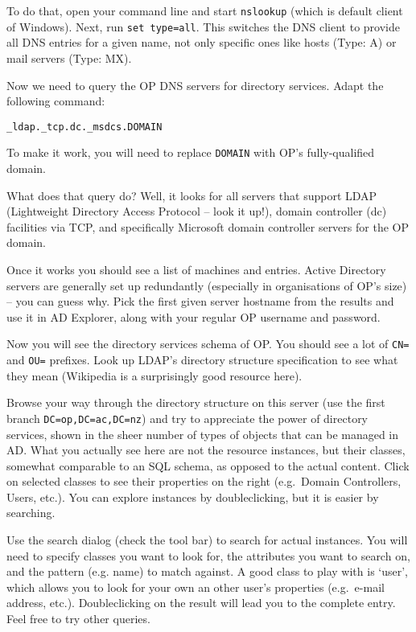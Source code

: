 \documentclass{article}
\begin{document}
To do that, open your command line and start {\tt nslookup} (which is default client of Windows). Next, run {\tt set type=all}. This switches the DNS client to provide all DNS entries for a given name, not only specific ones like hosts (Type: A) or mail servers (Type: MX).

Now we need to query the OP DNS servers for directory services. Adapt the following command:

{\tt \_ldap.\_tcp.dc.\_msdcs.DOMAIN}
 
To make it work, you will need to replace {\tt DOMAIN} with OP's fully-qualified domain.

What does that query do? Well, it looks for all servers that support LDAP (Lightweight Directory Access Protocol -- look it up!), domain controller (dc) facilities via TCP, and specifically Microsoft domain controller servers for the OP domain.

Once it works you should see a list of machines and entries. Active Directory servers are generally set up redundantly (especially in organisations of OP's size) -- you can guess why. Pick the first given server hostname from the results and use it in AD Explorer, along with your regular OP username and password.

Now you will see the directory services schema of OP. You should see a lot of {\tt CN=} and {\tt OU=} prefixes. Look up LDAP's directory structure specification to see what they mean (Wikipedia is a surprisingly good resource here).

Browse your way through the directory structure on this server (use the first branch {\tt DC=op,DC=ac,DC=nz}) and try to appreciate the power of directory services, shown in the sheer number of types of objects that can be managed in AD. What you actually see here are not the resource instances, but their classes, somewhat comparable to an SQL schema, as opposed to the actual content. Click on selected classes to see their properties on the right (e.g.~Domain Controllers, Users, etc.). You can explore instances by doubleclicking, but it is easier by searching.

Use the search dialog (check the tool bar) to search for actual instances. You will need to specify classes you want to look for, the attributes you want to search on, and the pattern (e.g. name) to match against. A good class to play with is `user', which allows you to look for your own an other user's properties (e.g.~e-mail address, etc.). Doubleclicking on the result will lead you to the complete entry. Feel free to try other queries.
\end{document}
